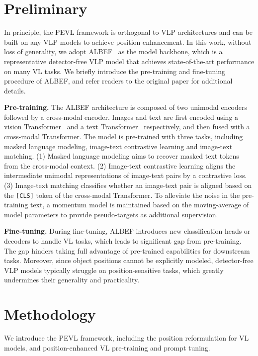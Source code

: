 \documentclass[11pt]{article}
\begin{document}
\section{Preliminary}
\label{sec:preliminary}

In principle, the PEVL framework is orthogonal to VLP architectures and can be built on any VLP models to achieve position enhancement. In this work, without loss of generality, we adopt ALBEF~\cite{li2021align} as the model backbone, which is a representative detector-free VLP model that achieves state-of-the-art performance on many VL tasks. We briefly introduce the pre-training and fine-tuning procedure of ALBEF, and refer readers to the original paper for additional details.

\smallskip
\textbf{Pre-training.} The ALBEF architecture is composed of two unimodal encoders followed by a cross-modal encoder. Images and text are first encoded using a vision Transformer~\cite{dosovitskiy2020image} and a text Transformer~\cite{vaswani2017attention} respectively, and then fused with a cross-modal Transformer. The model is pre-trained with three tasks, including masked language modeling, image-text contrastive learning and image-text matching. (1) Masked language modeling aims to recover masked text tokens from the cross-modal context. (2) Image-text contrastive learning aligns the intermediate unimodal representations of image-text pairs by a contrastive loss. (3) Image-text matching classifies whether an image-text pair is aligned based on the \texttt{[CLS]} token of the cross-modal Transformer. To alleviate the noise in the pre-training text, a momentum model is maintained based on the moving-average of model parameters to provide pseudo-targets as additional supervision.

\smallskip
\textbf{Fine-tuning.} During fine-tuning, ALBEF introduces new classification heads or decoders to handle VL tasks, which leads to significant gap from pre-training. The gap hinders taking full advantage of pre-trained capabilities for downstream tasks. Moreover, since object positions cannot be explicitly modeled, detector-free VLP models typically struggle on position-sensitive tasks, which greatly undermines their generality and practicality.


\section{Methodology}
We introduce the PEVL framework, including the position reformulation for VL models, and position-enhanced VL pre-training and prompt tuning.
\end{document}
